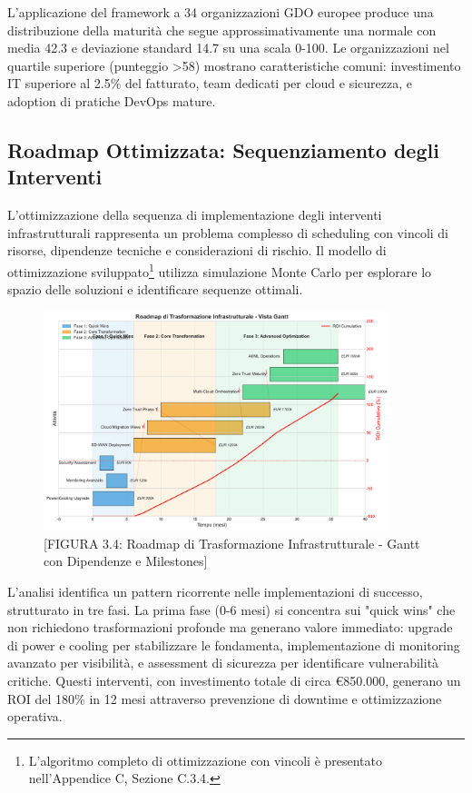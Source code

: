 L'applicazione del framework a 34 organizzazioni GDO europee produce una distribuzione della maturità che segue approssimativamente una normale con media 42.3 e deviazione standard 14.7 su una scala 0-100. Le organizzazioni nel quartile superiore (punteggio >58) mostrano caratteristiche comuni: investimento IT superiore al 2.5\% del fatturato, team dedicati per cloud e sicurezza, e adoption di pratiche DevOps mature.

\subsection{Roadmap Ottimizzata: Sequenziamento degli Interventi}

L'ottimizzazione della sequenza di implementazione degli interventi infrastrutturali rappresenta un problema complesso di scheduling con vincoli di risorse, dipendenze tecniche e considerazioni di rischio. Il modello di ottimizzazione sviluppato\footnote{L'algoritmo completo di ottimizzazione con vincoli è presentato nell'Appendice C, Sezione C.3.4.} utilizza simulazione Monte Carlo per esplorare lo spazio delle soluzioni e identificare sequenze ottimali.
\begin{figure}[htbp]
\centering
\includegraphics[width=0.9\textwidth]{thesis_figures/cap3/figura_3_4_roadmap.pdf}
\caption{[FIGURA 3.4: Roadmap di Trasformazione Infrastrutturale - Gantt con Dipendenze e Milestones]}
\label{fig:roadmap_transformation}
\end{figure}
L'analisi identifica un pattern ricorrente nelle implementazioni di successo, strutturato in tre fasi. La prima fase (0-6 mesi) si concentra sui "quick wins" che non richiedono trasformazioni profonde ma generano valore immediato: upgrade di power e cooling per stabilizzare le fondamenta, implementazione di monitoring avanzato per visibilità, e assessment di sicurezza per identificare vulnerabilità critiche. Questi interventi, con investimento totale di circa €850.000, generano un ROI del 180\% in 12 mesi attraverso prevenzione di downtime e ottimizzazione operativa.

